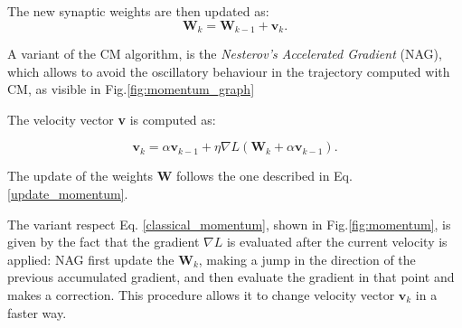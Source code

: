 			The new synaptic weights are then updated as:
			\begin{equation}
				\label{update_momentum}
				\textbf{W}_k = \textbf{W}_{k-1}  + \textbf{v}_k.
			\end{equation}

			A variant of the CM algorithm, is the \textit{Nesterov's Accelerated Gradient} (NAG), which allows to avoid the oscillatory behaviour in the trajectory computed with CM, as visible in Fig.\ref{fig:momentum_graph}%

			The velocity vector \textbf{v} is computed as:

			\begin{equation}
				\label{nesterov_momentum}
				\textbf{v}_k = \alpha\textbf{v}_{k-1} + \eta\nabla\textit{L}(\textbf{W}_k + \alpha\textbf{v}_{k-1}).
			\end{equation}

			The update of the weights \textbf{W} follows the one described in Eq. \ref{update_momentum}.

			The variant respect Eq. \ref{classical_momentum}, shown in Fig.\ref{fig:momentum}, is given by the fact that the gradient $\nabla\textit{L}$ is evaluated after the current velocity is applied: NAG first update the $\textbf{W}_k$, making a jump in the direction of the previous accumulated gradient, and then evaluate the gradient in that point and makes a correction. This procedure allows it to change velocity vector $\textbf{v}_{k}$ in a faster way.

